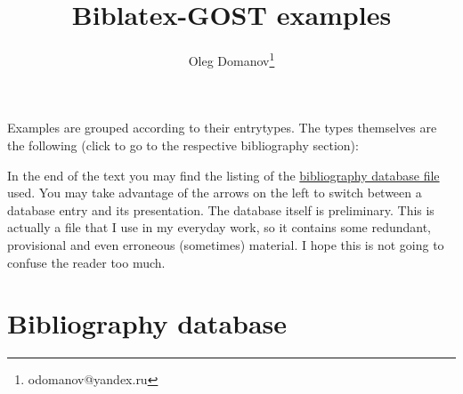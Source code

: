\documentclass[a4paper,10pt]{article}
\title{Biblatex-GOST examples}
\author{Oleg Domanov\thanks{odomanov@yandex.ru}}
\edef\mytempforAtCharacter{\char64}
\def\getkey#1#2{%
  \csappto{mytempforbibkey}{#1}%
  \ifstrequal{#2}{,}
  {\hspace{-4em}\makebox[4em]{\hyperlink{back:\mytempforbibkey}{$\Uparrow$}}%
   \raisebox{\baselineskip}{\hypertarget{\mytempforbibkey}{}}%
   \mytempforAtCharacter\mytempforbibtype\{\mytempforbibkey,}
  {\getkey#2}%
}
\renewcommand*{\do}[1]{\csdef{#1}##1{\def\mytempforbibtype{#1}\def\mytempforbibkey{}\getkey}}
\renewcommand*{\do}[1]{\csdef{#1}##1{\mytempforAtCharacter #1\{}}
\begin{document}
\maketitle
Examples are grouped according to their entrytypes. The types themselves are the following 
(click to go to the respective bibliography section):
\renewcommand*{\do}[1]{\hyperref[#1]{@#1}\\}
\begin{multicols}{5}
\noindent%
\end{multicols}

In the end of the text you may find the listing of the 
\hyperref[bibfile]{bibliography database file} used. 
You may take advantage of 
the arrows on the left to switch between a database entry and its presentation.
The database itself is preliminary. This is actually a file that I use in my everyday work, 
so it contains some redundant, provisional and even erroneous (sometimes) material. 
I hope this is not going to confuse the reader too much.  

\nocite{*}

\renewcommand*{\do}[1]{\section{@#1\label{#1}}\printbibliography[type=#1]}

\section{Bibliography database\label{bibfile}}
\end{document}
